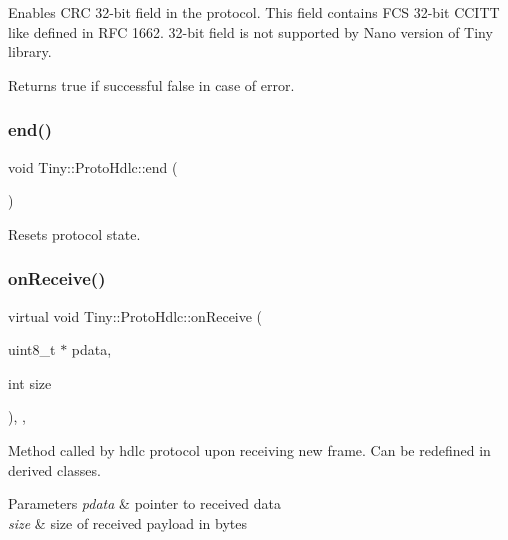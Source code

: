 Enables C\+RC 32-\/bit field in the protocol. This field contains F\+CS 32-\/bit C\+C\+I\+TT like defined in R\+FC 1662. 32-\/bit field is not supported by Nano version of Tiny library. \begin{DoxyReturn}{Returns}
true if successful false in case of error. 
\end{DoxyReturn}
\mbox{\label{classTiny_1_1ProtoHdlc_ad4b84cbcd33d65e7df73321a0c19c420}} 
\subsubsection{\texorpdfstring{end()}{end()}}
{\footnotesize\ttfamily void Tiny\+::\+Proto\+Hdlc\+::end (\begin{DoxyParamCaption}{ }\end{DoxyParamCaption})}

Resets protocol state. \mbox{\label{classTiny_1_1ProtoHdlc_afe7bd4445fb69598b80357869e2b785c}} 
\subsubsection{\texorpdfstring{on\+Receive()}{onReceive()}}
{\footnotesize\ttfamily virtual void Tiny\+::\+Proto\+Hdlc\+::on\+Receive (\begin{DoxyParamCaption}\item[{uint8\+\_\+t $\ast$}]{pdata,  }\item[{int}]{size }\end{DoxyParamCaption})\hspace{0.3cm}{\ttfamily [inline]}, {\ttfamily [protected]}, {\ttfamily [virtual]}}

Method called by hdlc protocol upon receiving new frame. Can be redefined in derived classes. 
\begin{DoxyParams}{Parameters}
{\em pdata} & pointer to received data \\
\hline
{\em size} & size of received payload in bytes \\
\hline
\end{DoxyParams}
\mbox{\label{classTiny_1_1ProtoHdlc_ae197714a219bf38e2408818334ee3108}} 
